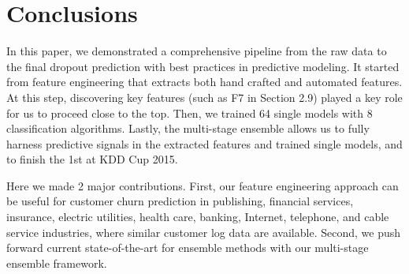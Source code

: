 \section{Conclusions}
In this paper, we demonstrated a comprehensive pipeline from the raw data to the final dropout prediction with best practices in  predictive modeling.  It started from feature engineering that extracts both hand crafted and automated features.  At this step, discovering key features (such as F7 in Section 2.9) played a key role for us to proceed close to the top. Then, we trained 64 single models with 8 classification algorithms. Lastly, the multi-stage ensemble allows us to fully harness predictive signals in the extracted features and trained single models, and to finish the 1st at KDD Cup 2015.

Here we made 2 major contributions.  First, our feature engineering approach can be useful for customer churn prediction in publishing, financial services, insurance, electric utilities, health care, banking, Internet, telephone, and cable service industries, where similar customer log data are available.  Second, we push forward current state-of-the-art for ensemble methods with our multi-stage ensemble framework.